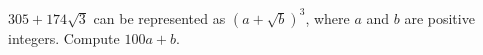 $305+174\sqrt3$ can be represented as $(a+\sqrt{b})^3$, where $a$ and $b$ are positive integers. Compute $100a + b$.
